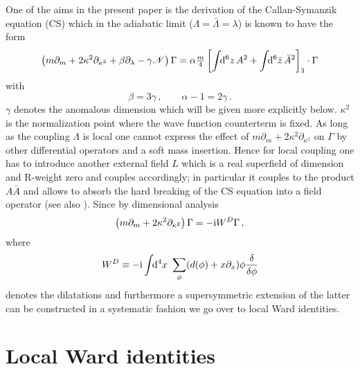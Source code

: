 \documentclass[a4paper,12pt]{article}
\newcommand{\N}{{\mathscr N}}
\newcommand{\I}{{\rm i}}
\def\pr{\partial}
\newcommand{\dx}{\!\!{\rm d}^4x\,\,}
\newcommand{\dS}{\!\!{\rm d}^6z\,}
\newcommand{\dSb}{\!\!{\rm d}^6\bar z\,}
\newcommand{\tfr}[2]{{\textstyle \frac{#1}{#2}}}
\newcommand{\fdq}[2]{\frac{\delta #1}{\delta #2}}
\begin{document}
One of the aims in the present paper is the derivation of the
Callan-Symanzik equation (CS) which in the adiabatic limit
($\Lambda=\bar\Lambda=\lambda$) is known \cite{CPS,PSbook} to have the
form
\begin{equation}
\left( m\pr_m + 2 \kappa^2 \pr_{\kappa^2} + \beta \pr_\lambda -\gamma \N
\right)\Gamma = \alpha \tfr{m}{4} \left[ \int \dS A^2 + \int \dSb \bar
  A^2\right]_3\cdot \Gamma
\label{CSstandard}
\end{equation}
with
\begin{equation}
\beta=3\gamma\,, \qquad \alpha-1 = 2\gamma\,.
\end{equation}
$\gamma$ denotes the anomalous dimension which will be given more
explicitly below. $\kappa^2$ is the normalization point where the wave
function counterterm is fixed. As long as the coupling $\Lambda$ is local
one cannot express the effect of $m\pr_m + 2\kappa^2 \pr_{\kappa^2}$ on
$\Gamma$ by other differential operators and a soft mass insertion. Hence
for local coupling
one has to introduce another external field $L$ which is a real superfield of
dimension and R-weight zero and couples accordingly;
  in particular it
couples to the product $A \bar A$ and allows to absorb the hard breaking of the CS equation into a field operator (see also \cite{KRST01,AGLR98}).  
Since by dimensional analysis 
\begin{equation}
\left( m\pr_m + 2\kappa^2 \pr_{\kappa^2} \right) \Gamma = -\I W^D \Gamma\,,
\end{equation}
where
\begin{equation}
W^D \equiv -\I \int \dx \sum_\phi (d(\phi) + x \pr_x) \phi \fdq{}{\phi}
\end{equation}
denotes the dilatations and furthermore a supersymmetric extension of the
latter can be constructed in a systematic fashion \cite{CPS,PSbook} we go
over to local Ward identities.


\section{Local Ward identities}
\setcounter{equation}{0}
\end{document}
